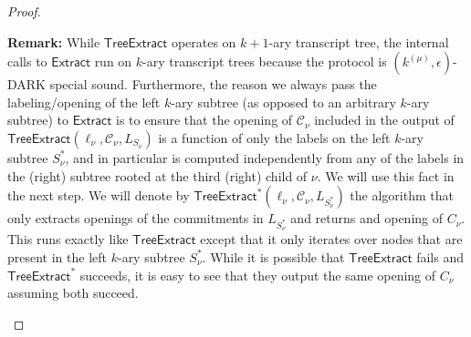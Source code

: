 \begin{proof}
\begin{itemize}
\textbf{Remark:} While $\textsf{TreeExtract}$ operates on $k+1$-ary transcript tree, the internal calls to $\textsf{Extract}$ run on $k$-ary transcript trees because the protocol is $(k^{(\mu)}, \epsilon)$-DARK special sound. Furthermore, the reason we always pass the labeling/opening of the left $k$-ary subtree (as opposed to an arbitrary $k$-ary subtree) to $\textsf{Extract}$ is to ensure that the opening of $\mathcal{C}_\nu$ included in the output of $\textsf{TreeExtract}(\ell_\nu, \mathcal{C}_\nu, L_{S_\nu})$ is a function of only the labels on the left $k$-ary subtree $S^*_\nu$, and in particular is computed independently from any of the labels in the (right) subtree rooted at the third (right) child of $\nu$. We will use this fact in the next step. We will denote by $\textsf{TreeExtract}^*(\ell_\nu, \mathcal{C}_\nu, L_{S^*_\nu})$ the algorithm that only extracts openings of the commitments in $L_{S^*_\nu}$ and returns and opening of $C_\nu$. This runs exactly like $\textsf{TreeExtract}$ except that it only iterates over nodes that are present in the left $k$-ary subtree $S^*_\nu$. While it is possible that $\textsf{TreeExtract}$ fails and $\textsf{TreeExtract}^*$ succeeds, it is easy to see that they output the same opening of $C_\nu$ assuming both succeed. 


\end{itemize}
\end{proof}
